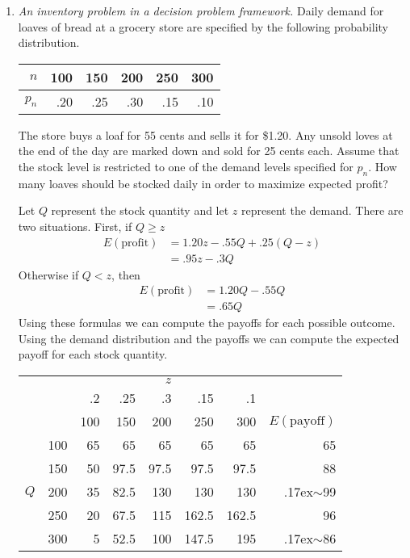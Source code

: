 \begin{enumerate}
\item \emph{An inventory problem in a decision problem framework.} 
Daily demand for loaves of bread at a
  grocery store are specified by the following probability
  distribution.

\vspace{.2in}
\begin{tabular}{r|rrrrr}
$n$ & 100 & 150 & 200 & 250 & 300 \\ \hline
$p_n$ & .20 & .25 & .30 & .15 & .10 \\
\end{tabular}

\vspace{.2in}
The store buys a loaf for 55 cents and sells it for \$1.20. Any
unsold loves at the end of the day are marked down and sold for 25
cents each. Assume that the stock level is restricted to one of the
demand levels specified for $p_n$. How many loaves should be
stocked daily in order to maximize expected profit?

\begin{solution}
\bs
Let $Q$ represent the stock quantity and let $z$ represent the
demand. There are two situations. First, if $Q \geq z$
\begin{align*}
E(\text{profit}) &= 1.20z - .55Q + .25(Q-z) \\
&= .95z - .3Q
\end{align*}
Otherwise if $Q < z$, then
\begin{align*}
E(\text{profit}) &= 1.20Q - .55Q\\
&= .65Q
\end{align*}
Using these formulas we can compute the payoffs for each
possible outcome. Using the demand distribution and the
payoffs we can compute the expected payoff for each stock
quantity.

\begin{center}
\begin{tabular}{rr|rrrrrr}
& & \multicolumn{5}{c}{$z$} & \\
& & .2 & .25 & .3 & .15 & .1 & \\
& & 100 & 150 & 200 & 250 & 300 &  $E(\text{payoff})$ \\ \hline
\multirow{5}{*}{$Q$} & 100 & 65 & 65 & 65 & 65 & 65 & 65 \\
& 150 & 50 & 97.5 & 97.5 & 97.5 & 97.5 & 88 \\
& 200 & 35 & 82.5 & 130 & 130 & 130 & {\raise.17ex\hbox{$\scriptstyle\sim$}}99 \\
& 250 & 20 & 67.5 & 115 & 162.5 & 162.5 & 96 \\
& 300 & 5 & 52.5 & 100 & 147.5 & 195 & {\raise.17ex\hbox{$\scriptstyle\sim$}}86
\end{tabular}
\end{center}


\end{solution}
\end{enumerate}
